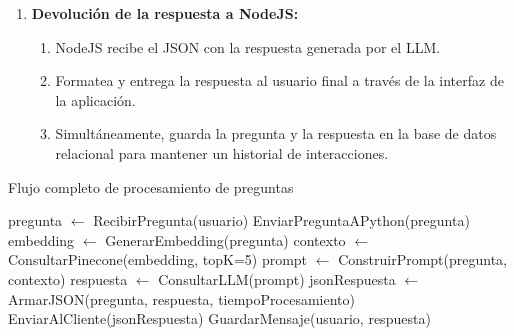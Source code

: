 \begin{enumerate}
\begin{itemize}
\begin{enumerate}
                              \item \textbf{Devolución de la respuesta a NodeJS:}
                                    \begin{enumerate}
                                          \item NodeJS recibe el JSON con la respuesta generada por el LLM.
                                          \item Formatea y entrega la respuesta al usuario final a través de la interfaz de la
                                                aplicación.
                                          \item Simultáneamente, guarda la pregunta y la respuesta en la base de datos
                                                relacional para mantener un historial de interacciones.
                                    \end{enumerate}
                        \end{enumerate}

                        \begin{algorithm}[H]
                              \caption{Flujo completo de procesamiento de preguntas}
                              \label{alg:flujo-completo-preguntas}
                              \begin{algorithmic}[1]
                                    \State pregunta $\gets$ RecibirPregunta(usuario)
                                    \State EnviarPreguntaAPython(pregunta)
                                    \State embedding $\gets$ GenerarEmbedding(pregunta)
                                    \State contexto $\gets$ ConsultarPinecone(embedding, topK=5)
                                    \State prompt $\gets$ ConstruirPrompt(pregunta, contexto)
                                    \State respuesta $\gets$ ConsultarLLM(prompt)
                                    \State jsonRespuesta $\gets$ ArmarJSON(pregunta, respuesta, tiempoProcesamiento)
                                    \State EnviarAlCliente(jsonRespuesta)
                                    \State GuardarMensaje(usuario, respuesta)
                                    \EndProcedure
                              \end{algorithmic}
                        \end{algorithm}


\end{itemize}
\end{enumerate}

